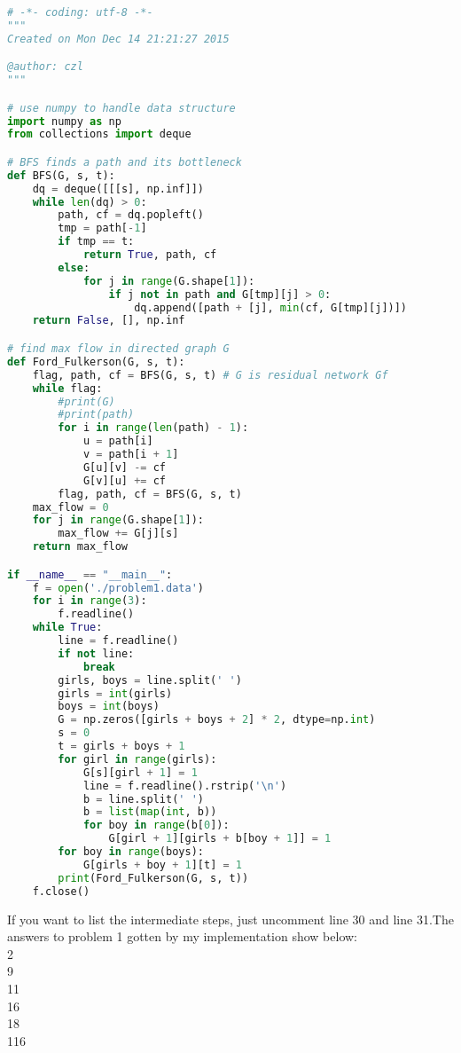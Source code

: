 \documentclass[a4paper,12pt]{article}
\begin{document}
\begin{lstlisting}[language=python]
# -*- coding: utf-8 -*-
"""
Created on Mon Dec 14 21:21:27 2015

@author: czl
"""

# use numpy to handle data structure
import numpy as np
from collections import deque

# BFS finds a path and its bottleneck
def BFS(G, s, t):
    dq = deque([[[s], np.inf]])
    while len(dq) > 0:
        path, cf = dq.popleft()
        tmp = path[-1]
        if tmp == t:
            return True, path, cf
        else:
            for j in range(G.shape[1]):
                if j not in path and G[tmp][j] > 0:
                    dq.append([path + [j], min(cf, G[tmp][j])])
    return False, [], np.inf

# find max flow in directed graph G
def Ford_Fulkerson(G, s, t):
    flag, path, cf = BFS(G, s, t) # G is residual network Gf
    while flag:
        #print(G)
        #print(path)
        for i in range(len(path) - 1):
            u = path[i]
            v = path[i + 1]
            G[u][v] -= cf
            G[v][u] += cf
        flag, path, cf = BFS(G, s, t)
    max_flow = 0
    for j in range(G.shape[1]):
        max_flow += G[j][s]
    return max_flow

if __name__ == "__main__":
    f = open('./problem1.data')
    for i in range(3):
        f.readline()
    while True:
        line = f.readline()
        if not line:
            break
        girls, boys = line.split(' ')
        girls = int(girls)
        boys = int(boys)
        G = np.zeros([girls + boys + 2] * 2, dtype=np.int)
        s = 0
        t = girls + boys + 1
        for girl in range(girls):
            G[s][girl + 1] = 1
            line = f.readline().rstrip('\n')
            b = line.split(' ')
            b = list(map(int, b))
            for boy in range(b[0]):
                G[girl + 1][girls + b[boy + 1]] = 1
        for boy in range(boys):
            G[girls + boy + 1][t] = 1
        print(Ford_Fulkerson(G, s, t))
    f.close()
\end{lstlisting}

If you want to list the intermediate steps, just uncomment line 30 and line 31.The answers to problem 1 gotten by my implementation show below:
\\
2\\
9\\
11\\
16\\
18\\
116
\end{document}
